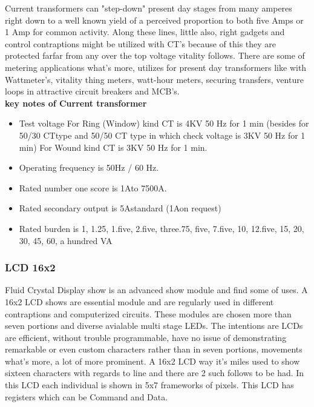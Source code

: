 \documentclass[12pt,a4paper]{article}
\begin{document}
Current transformers can "step-down" present day stages from many amperes right down to a 
well known yield of a perceived proportion to both five Amps or 1 Amp for common activity. Along these lines, little 
also, right gadgets and control contraptions might be utilized with CT's because of this they are 
protected farfar from any over the top voltage vitality follows. There are some of metering applications 
what's more, utilizes for present day transformers like with Wattmeter's, vitality thing meters, watt-hour meters, 
securing transfers, venture loops in attractive circuit breakers and MCB's.\\

\textbf{\large{key notes of Current transformer}}\\ 
\begin{itemize}
	\item Test voltage For Ring (Window) kind  CT is 4KV 50 Hz for 1 min (besides  for 50/30 CTtype and 50/50 CT type  in which check voltage is 3KV 50 Hz for 1 min) For Wound kind  CT is 3KV 50 Hz for 1 min.
	\item Operating frequency is 50Hz / 60 Hz.
	\item Rated number one score is 1Ato 7500A.
	\item Rated secondary output is 5Astandard (1Aon request)
	\item Rated burden is 1, 1.25, 1.five, 2.five, three.75, five, 7.five, 10, 12.five, 15, 20, 30, 45, 60, a hundred VA

\end{itemize}

\subsubsection{LCD 16x2}
\hspace{0.5cm}Fluid Crystal Display show is an advanced show module and find some of uses. A 16x2 LCD shows are essential module and are regularly used in different 
contraptions and computerized circuits. These modules are chosen more than seven portions and diverse avialable multi stage LEDs. The intentions are LCDs are efficient, without trouble programmable, have no 
issue of demonstrating remarkable or even custom characters rather than in seven portions, movements 
what's more, a lot of more prominent. A 16x2 LCD way it's miles used to show sixteen characters with regards to line and there are 
2 such follows to be had. In this LCD each individual is shown in 5x7 frameworks of pixels. This 
LCD has registers which can be Command and Data.\\
\end{document}
